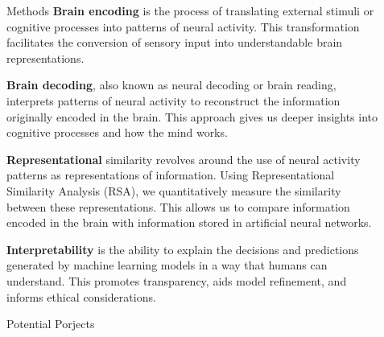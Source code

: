 \documentclass[final]{beamer}
\newlength{\sepwidth}
\newlength{\colwidth}
\newcommand{\separatorcolumn}{\begin{column}{\sepwidth}\end{column}}
\begin{document}
\begin{frame}[t]
\begin{columns}[t]
\begin{column}{\colwidth}
\end{column}

\separatorcolumn

\begin{column}{\colwidth}

  \begin{block}{Methods}
      \textbf{Brain encoding} is the process of translating external stimuli or cognitive processes into patterns of neural activity. This transformation facilitates the conversion of sensory input into understandable brain representations.

\textbf{Brain decoding}, also known as neural decoding or brain reading, interprets patterns of neural activity to reconstruct the information originally encoded in the brain. This approach gives us deeper insights into cognitive processes and how the mind works.

\textbf{Representational} similarity revolves around the use of neural activity patterns as representations of information. Using Representational Similarity Analysis (RSA), we quantitatively measure the similarity between these representations. This allows us to compare information encoded in the brain with information stored in artificial neural networks.

\textbf{Interpretability} is the ability to explain the decisions and predictions generated by machine learning models in a way that humans can understand. This promotes transparency, aids model refinement, and informs ethical considerations.

  \end{block}

  \begin{exampleblock}{Potential Porjects}


\end{exampleblock}
\end{column}
\end{columns}
\end{frame}
\end{document}
